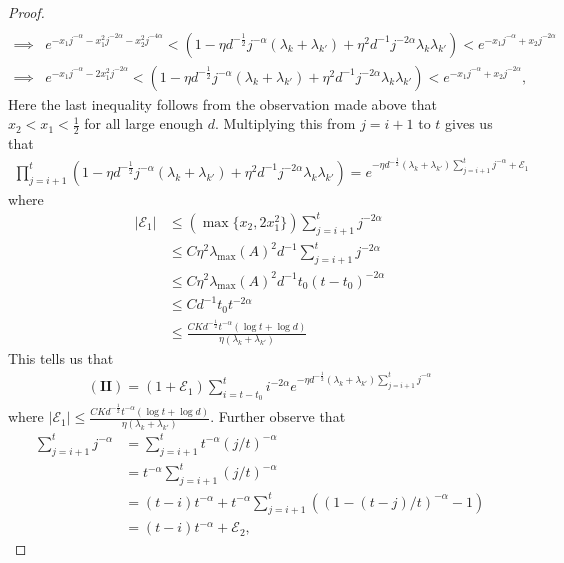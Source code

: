 \documentclass[10pt,a4paper]{amsart}
\begin{document}
\begin{proof}
\begin{align*}
\\
\implies& e^{-x_1j^{-\alpha} - x_1^2j^{-2\alpha} - x^2_2j^{-4\alpha}} <  (1 - \eta d^{-\frac{1}{2}}j^{-\alpha} (\lambda_k + \lambda_{k'}) + \eta^2 d^{-1} j^{-2\alpha} \lambda_{k} \lambda_{k'}) < e^{-x_1j^{-\alpha} + x_2j^{-2\alpha}}
\\
\implies & e^{-x_1 j^{-\alpha} - 2x_1^2j^{-2\alpha}} < (1 - \eta d^{-\frac{1}{2}}j^{-\alpha} (\lambda_k + \lambda_{k'}) + \eta^2 d^{-1} j^{-2\alpha} \lambda_{k} \lambda_{k'}) < e^{-x_1j^{-\alpha} + x_2 j^{-2\alpha}},
\end{align*}
Here the last inequality follows from the observation made above that $x_2 < x_1 < \frac{1}{2}$ for all large enough $d$. Multiplying this from $j = i+1$ to $t$ gives us that
\begin{align*}
\prod_{j = i+1}^t (1 - \eta d^{-\frac{1}{2}}j^{-\alpha} (\lambda_k + \lambda_{k'}) + \eta^2d^{-1}j^{-2\alpha} \lambda_{k} \lambda_{k'}) = e^{-\eta d^{-\frac{1}{2}}(\lambda_k + \lambda_{k'})\sum_{j = i+1}^t j^{-\alpha} + \mathcal E_1}
\end{align*}
where 
\begin{align*}
    |\mathcal E_1| &\leq (\max\{x_2, 2x^2_1\})\sum_{j = i+1}^t j^{-2\alpha}
    \\
    &\leq C\eta^2 \lambda_{\max}(A)^2 d^{-1}\sum_{j = i+1}^t j^{-2\alpha}
    \\
    &\leq C \eta^2 \lambda_{\max}(A)^2 d^{-1} t_0 (t-t_0)^{-2\alpha}
    \\
    &\leq C d^{-1} t_0 t^{-2\alpha}
    \\
    &\leq \frac{CK d^{-\frac{1}{2}}t^{-\alpha} (\log t + \log d)}{\eta (\lambda_k + \lambda_{k'})}
\end{align*}
This tells us that
\begin{align*}
\mathbf{(II)} = (1 + \mathcal E_1)\sum_{i = t-t_0}^t i^{-2\alpha} e^{-\eta d^{-\frac{1}{2}} (\lambda_k + \lambda_{k'})\sum_{j = i+1}^t j^{-\alpha}}
\end{align*}
where $|\mathcal E_1| \leq \frac{CK d^{-\frac{1}{2}}t^{-\alpha} (\log t + \log d)}{\eta (\lambda_k + \lambda_{k'})}$. Further observe that
\begin{align*}
\sum_{j = i+1}^t j^{-\alpha} &= \sum_{j = i+1}^t t^{-\alpha}(j/t)^{-\alpha}
\\
&= t^{-\alpha} \sum_{j = i+1}^t (j/t)^{-\alpha}
\\
&= (t-i)t^{-\alpha} + t^{-\alpha}\sum_{j = i+1}^t ((1 - (t-j)/t)^{-\alpha} - 1)
\\
&= (t-i)t^{-\alpha} + \mathcal E_2,

\end{align*}
\end{proof}
\end{document}

